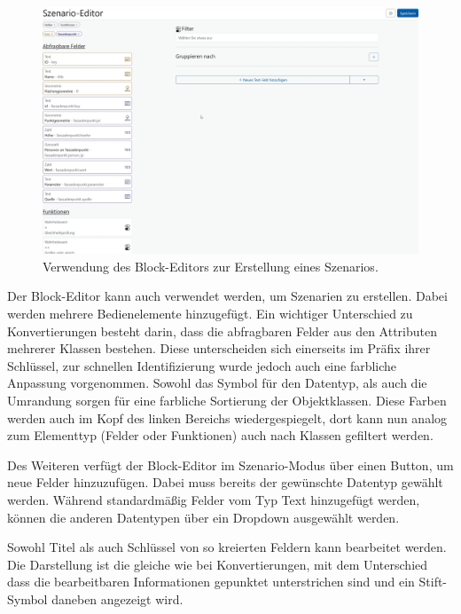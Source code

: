\begin{figure}[ht]
  \begin{center}
    \includegraphics[width=.95\textwidth]{assets/buffet-scenario.png}
  \end{center}
  \caption{Verwendung des Block-Editors zur Erstellung eines Szenarios. }
  \label{fig:buffet-scenario}
\end{figure}

Der Block-Editor kann auch verwendet werden, um Szenarien zu erstellen. Dabei werden mehrere Bedienelemente hinzugefügt. Ein wichtiger Unterschied zu Konvertierungen besteht darin, dass die abfragbaren Felder aus den Attributen mehrerer Klassen bestehen. Diese unterscheiden sich einerseits im Präfix ihrer Schlüssel, zur schnellen Identifizierung wurde jedoch auch eine farbliche Anpassung vorgenommen. Sowohl das Symbol für den Datentyp, als auch die Umrandung sorgen für eine farbliche Sortierung der Objektklassen. Diese Farben werden auch im Kopf des linken Bereichs wiedergespiegelt, dort kann nun analog zum Elementtyp (Felder oder Funktionen) auch nach Klassen gefiltert werden. 

Des Weiteren verfügt der Block-Editor im Szenario-Modus über einen Button, um neue Felder hinzuzufügen. Dabei muss bereits der gewünschte Datentyp gewählt werden. Während standardmäßig Felder vom Typ Text hinzugefügt werden, können die anderen Datentypen über ein Dropdown ausgewählt werden.

Sowohl Titel als auch Schlüssel von so kreierten Feldern kann bearbeitet werden. Die Darstellung ist die gleiche wie bei Konvertierungen, mit dem Unterschied dass die bearbeitbaren Informationen gepunktet unterstrichen sind und ein Stift-Symbol daneben angezeigt wird.
